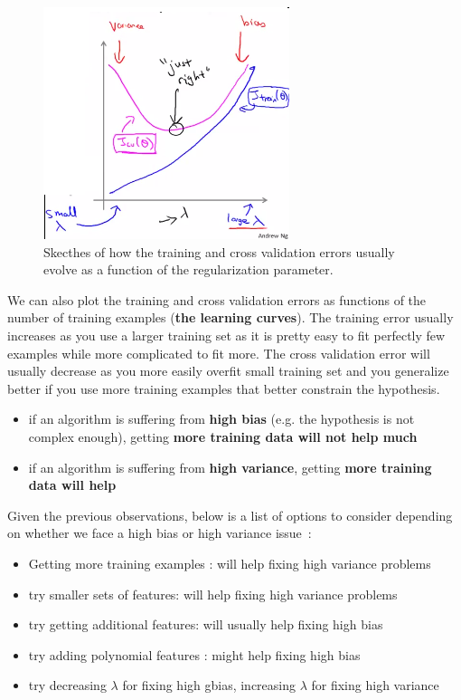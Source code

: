 \documentclass[10pt,a4paper]{article}
\begin{document}
\begin{figure}[htbp]
\includegraphics[width=0.5\columnwidth]{./Figs/bias_variance_regularization.png}
\caption{\label{fig:bias_variance_regularization} Skecthes of how the training and cross validation errors usually evolve as a function of the regularization parameter.}
\end{figure}

We can also plot the training and cross validation errors as functions of the number of training examples (\textbf{the learning curves}). The training error usually increases as you use a larger training set as it is pretty easy to fit perfectly few examples while more complicated to fit more. The cross validation error will usually decrease as you more easily overfit small training set and you generalize better if you use more training examples that better constrain the hypothesis.

\begin{itemize} 
\item if an algorithm is suffering from \textbf{high bias} (e.g. the hypothesis is not complex enough), getting \textbf{more training data will not help much}
\item if an algorithm is suffering from \textbf{high variance}, getting \textbf{more training data will help}
\end{itemize}

Given the previous observations, below is a list of options to consider depending on whether we face a high bias or high variance issue~:
\begin{itemize}
\item Getting more training examples : will help fixing high variance problems
\item try smaller sets of features: will help fixing high variance problems
\item try getting additional features: will usually help fixing high bias
\item try adding polynomial features : might help fixing high bias
\item try decreasing $\lambda$ for fixing high gbias, increasing $\lambda$ for fixing high variance
\end{itemize}
\end{document}
